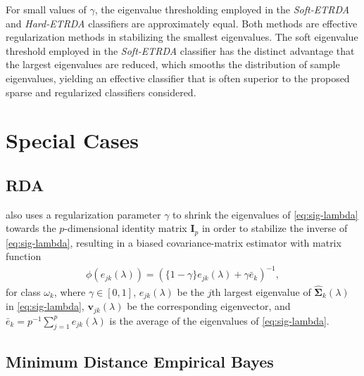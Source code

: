 \documentclass[11pt]{article}
\begin{document}
For small values of $\gamma$, the eigenvalue thresholding employed in the \emph{Soft-ETRDA} and \emph{Hard-ETRDA} classifiers are approximately equal. Both methods are effective regularization methods in stabilizing the smallest eigenvalues. The soft eigenvalue threshold employed in the \emph{Soft-ETRDA} classifier has the distinct advantage that the largest eigenvalues are reduced, which smooths the distribution of sample eigenvalues, yielding an effective classifier that is often superior to the proposed sparse and regularized classifiers considered.

\section{Special Cases}

\subsection{RDA}

\cite{Friedman:1989tm} also uses a regularization parameter $\gamma$ to shrink the
eigenvalues of \eqref{eq:sig-lambda} towards the $p$-dimensional identity matrix $\bm I_p$
in order to stabilize the inverse of \eqref{eq:sig-lambda}, resulting in a biased
covariance-matrix estimator with matrix function
\begin{align}
	\phi(e_{jk}(\lambda)) = (\{1 - \gamma\} e_{jk}(\lambda) + \gamma \bar{e}_k)^{-1},\label{eq:rda-eigenvalue-function}
\end{align}
for class $\omega_k$, where $\gamma \in [0, 1]$, $e_{jk}(\lambda)$ be the $j$th largest eigenvalue of $\widehat{\bm\Sigma}_k(\lambda)$ in \eqref{eq:sig-lambda}, $\bm v_{jk}(\lambda)$ be the corresponding eigenvector, and $\bar{e}_k = p^{-1} \sum_{j=1}^p e_{jk}(\lambda)$ is the average of the eigenvalues of \eqref{eq:sig-lambda}.

\subsection{Minimum Distance Empirical Bayes}
\end{document}
